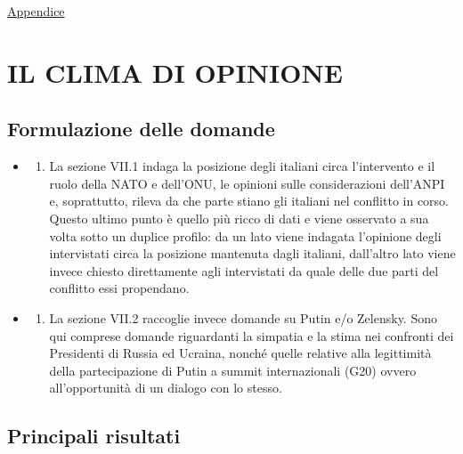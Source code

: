 \documentclass[
  openany]{book}
\providecommand{\tightlist}{%
  \setlength{\itemsep}{0pt}\setlength{\parskip}{0pt}}
\begin{document}
\href{https://github.com/LucianaFazio/Ucrania/blob/main/PDF_Appendice/VI.\%20Gli\%20effetti\%20del\%20conflitto\%20v.3.pdf}{Appendice}

\hypertarget{il-clima-di-opinione}{%
\chapter{IL CLIMA DI OPINIONE}\label{il-clima-di-opinione}}

\hypertarget{formulazione-delle-domande-5}{%
\section{Formulazione delle domande}\label{formulazione-delle-domande-5}}

\begin{itemize}
\item
  \begin{enumerate}
  \def\labelenumi{\alph{enumi})}
  \tightlist
  \item
    La sezione VII.1 indaga la posizione degli italiani circa l'intervento e il ruolo della NATO e dell'ONU, le opinioni sulle considerazioni dell'ANPI e, soprattutto, rileva da che parte stiano gli italiani nel conflitto in corso. Questo ultimo punto è quello più ricco di dati e viene osservato a sua volta sotto un duplice profilo: da un lato viene indagata l'opinione degli intervistati circa la posizione mantenuta dagli italiani, dall'altro lato viene invece chiesto direttamente agli intervistati da quale delle due parti del conflitto essi propendano.
  \end{enumerate}
\item
  \begin{enumerate}
  \def\labelenumi{\alph{enumi})}
  \setcounter{enumi}{1}
  \tightlist
  \item
    La sezione VII.2 raccoglie invece domande su Putin e/o Zelensky. Sono qui comprese domande riguardanti la simpatia e la stima nei confronti dei Presidenti di Russia ed Ucraina, nonché quelle relative alla legittimità della partecipazione di Putin a summit internazionali (G20) ovvero all'opportunità di un dialogo con lo stesso.
  \end{enumerate}
\end{itemize}

\hypertarget{principali-risultati-5}{%
\section{Principali risultati}\label{principali-risultati-5}}
\end{document}
